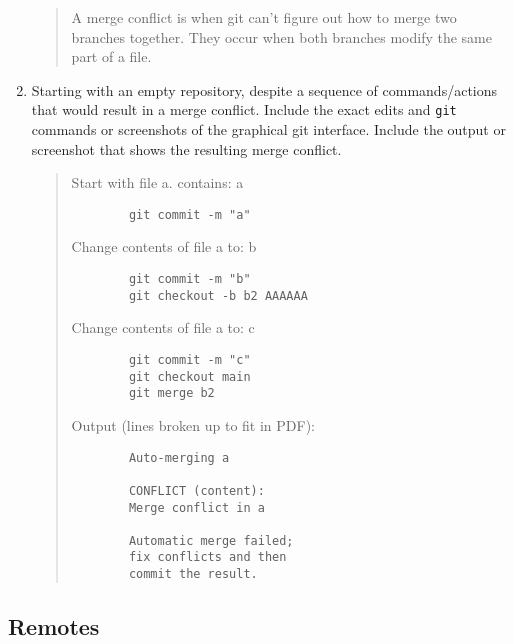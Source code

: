 \documentclass[10pt,twocolumn]{article}
\begin{document}
\begin{enumerate}
\begin{quote}
    A merge conflict is when git can't figure out how to merge two branches
    together. They occur when both branches modify the same part of a file.
\end{quote}
\item Starting with an empty repository, despite a sequence of commands/actions that would result in a merge conflict. Include the exact edits and \texttt{git} commands or screenshots of the graphical git interface. Include the output or screenshot that shows the resulting merge conflict.
    \begin{quote}
        Start with file a. contains: a
        \begin{verbatim}
        git commit -m "a"
        \end{verbatim}
        Change contents of file a to: b
        \begin{verbatim}
        git commit -m "b"
        git checkout -b b2 AAAAAA
        \end{verbatim}
        Change contents of file a to: c
        \begin{verbatim}
        git commit -m "c"
        git checkout main
        git merge b2
        \end{verbatim}
        Output (lines broken up to fit in PDF):
        \begin{verbatim}
        Auto-merging a

        CONFLICT (content):
        Merge conflict in a

        Automatic merge failed;
        fix conflicts and then
        commit the result.
        \end{verbatim}
    \end{quote}
\end{enumerate}

\subsection{Remotes}
\end{document}
